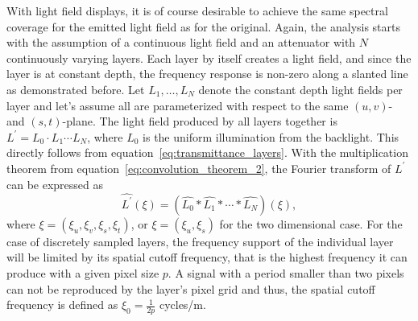 With light field displays, it is of course desirable to achieve the same spectral coverage for the emitted light field as for the original.
Again, the analysis starts with the assumption of a continuous light field and an attenuator with $N$ continuously varying layers.
Each layer by itself creates a light field, and since the layer is at constant depth, the frequency response is non-zero along a slanted line as demonstrated before.
Let $L_1, \dots , L_N$ denote the constant depth light fields per layer and let's assume all are parameterized with respect to the same $(u, v)$- and \mbox{$(s, t)$-plane}.
The light field produced by all layers together is $L^\prime = L_0 \cdot L_1 \cdots L_N$, where $L_0$ is the uniform illumination from the backlight.
This directly follows from equation~\ref{eq:transmittance_layers}.
With the multiplication theorem from equation~\ref{eq:convolution_theorem_2}, the Fourier transform of $L^\prime$ can be expressed as
\begin{equation}\label{eq:convolution_of_layers}
	\widehat{L^\prime}(\xi) = (\widehat{L_0} \ast \widehat{L_1} \ast \cdots \ast \widehat{L_N}) (\xi), 
\end{equation}
where $\xi = (\xi_u, \xi_v, \xi_s, \xi_t)$, or $\xi = (\xi_u, \xi_s)$ for the two dimensional case.
For the case of discretely sampled layers, the frequency support of the individual layer will be limited by its spatial cutoff frequency, that is the highest frequency it can produce with a given pixel size $p$.
A signal with a period smaller than two pixels can not be reproduced by the layer's pixel grid and thus, the spatial cutoff frequency is defined as $\xi_0 = \frac{1}{2p}$ cycles/m.
